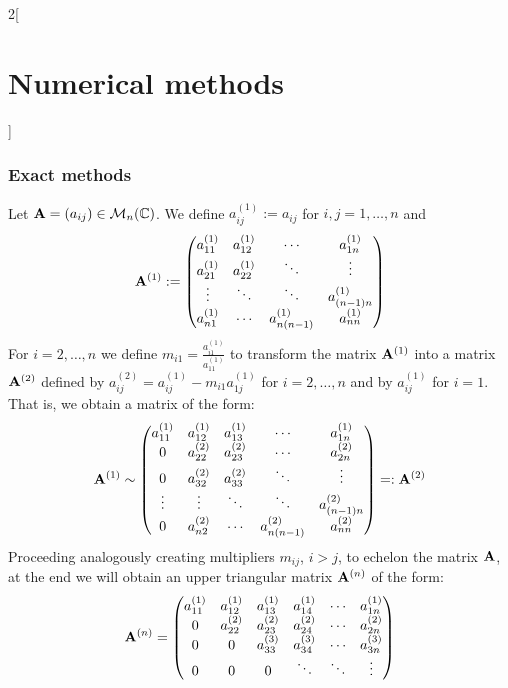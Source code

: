 \documentclass[../../../main.tex]{subfiles}
\begin{document}
\begin{multicols}{2}[\section{Numerical methods}]
\subsubsection*{Exact methods}
\begin{method}
    Let $\mathblack{A}=(a_{ij})\in\mathcal{M}_n(\CC)$. We define $a_{ij}^{(1)}:=a_{ij}$ for $i,j=1,\ldots,n$ and 
    $$\mathblack{A}^{(1)}:=
    \begin{pmatrix}
        a_{11}^{(1)} & a_{12}^{(1)} & \cdots & a_{1n}^{(1)}\\
        a_{21}^{(1)} & a_{22}^{(1)} & \ddots & \vdots \\
        \vdots & \ddots & \ddots & a_{(n-1)n}^{(1)}\\
        a_{n1}^{(1)} & \cdots & a_{n(n-1)}^{(1)} & a_{nn}^{(1)}
    \end{pmatrix}
    $$
    For $i=2,\ldots,n$ we define $m_{i1}=\frac{a_{i1}^{(1)}}{a_{11}^{(1)}}$ to transform the matrix $\mathblack{A}^{(1)}$ into a matrix $\mathblack{A}^{(2)}$ defined by $a_{ij}^{(2)}=a_{ij}^{(1)}-m_{i1}a_{1j}^{(1)}$ for $i=2,\ldots,n$ and by $a_{ij}^{(1)}$ for $i=1$. That is, we obtain a matrix of the form:
    $$\mathblack{A}^{(1)}\sim
    \begin{pmatrix}
        a_{11}^{(1)} & a_{12}^{(1)} & a_{13}^{(1)} & \cdots & a_{1n}^{(1)}\\
        0 & a_{22}^{(2)} & a_{23}^{(2)} & \cdots & a_{2n}^{(2)}\\
        0 & a_{32}^{(2)} & a_{33}^{(2)} & \ddots & \vdots   \\
        \vdots & \vdots & \ddots & \ddots & a_{(n-1)n}^{(2)}\\
        0& a_{n2}^{(2)} & \cdots & a_{n(n-1)}^{(2)} & a_{nn}^{(2)}
    \end{pmatrix} =:\mathblack{A}^{(2)}
    $$
    Proceeding analogously creating multipliers $m_{ij}$, $i>j$, to echelon the matrix $\mathblack{A}$, at the end we will obtain an upper triangular matrix $\mathblack{A}^{(n)}$ of the form:
    $$\mathblack{A}^{(n)}=
    \begin{pmatrix}
        a_{11}^{(1)} & a_{12}^{(1)} & a_{13}^{(1)} & a_{14}^{(1)} & \cdots & a_{1n}^{(1)}\\
        0 & a_{22}^{(2)} & a_{23}^{(2)} & a_{24}^{(2)} & \cdots & a_{2n}^{(2)}\\
        0 & 0 & a_{33}^{(3)} & a_{34}^{(3)} & \cdots & a_{3n}^{(3)}   \\
        0 & 0 & 0 & \ddots & \ddots & \vdots\\

\end{pmatrix}$$
\end{method}
\end{multicols}
\end{document}
